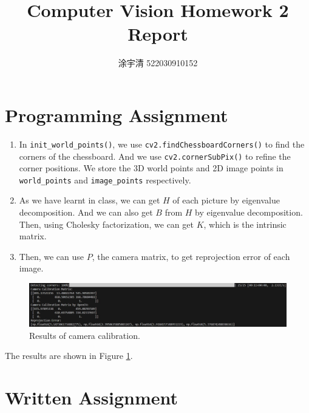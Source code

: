 \documentclass[bwprint]{gmcmthesis}
\title{Computer Vision Homework 2 Report}
\author{涂宇清 522030910152}
\date{}
\numberwithin{figure}{section}
\begin{document}
\setlength{\parskip}{10pt}
\baselineskip
\maketitle

\section{Programming Assignment}
\begin{enumerate}
    \item In \verb|init_world_points()|, we use \verb|cv2.findChessboardCorners()| to find the corners of the chessboard. And we use \verb|cv2.cornerSubPix()| to refine the corner positions. We store the 3D world points and 2D image points in \verb|world_points| and \verb|image_points| respectively.
    \item As we have learnt in class, we can get $H$ of each picture by eigenvalue decomposition. And we can also get $B$ from $H$ by eigenvalue decomposition. Then, using Cholesky factorization, we can get $K$, which is the intrinsic matrix.
    \item Then, we can use $P$, the camera matrix, to get reprojection error of each image.
\end{enumerate}

\begin{figure}[htpb]
    \centering
    \includegraphics[width=\textwidth]{pictures/result.png}
    \caption{Results of camera calibration.}
    \label{fig:results}
\end{figure}

The results are shown in Figure \ref{fig:results}.


\section{Written Assignment}
\end{document}
